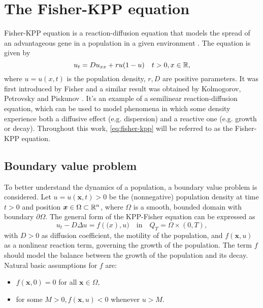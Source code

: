 \section{The Fisher-KPP equation}
Fisher-KPP equation is a reaction-diffusion equation that models the spread of an advantageous gene in a population in a given environment \cite{SalsaVerziniPDE}. The equation is given by
\begin{equation}
    u_t = Du_{xx} + ru(1-u) \quad t > 0, x \in \mathbb{R},
    \label{eq:fisher-kpp}
\end{equation}
where $u = u(x, t)$ is the population density, $r, D$ are positive parameters. It was first introduced by Fisher \cite{Fisher1937} and a similar result was obtained by Kolmogorov, Petrovsky and Piskunov \cite{KPP1937}. It's an example of a semilinear reaction-diffusion equation, which can be used to model phenomena in which some density experience both a diffusive effect (e.g. dispersion) and a reactive one (e.g. growth or decay). Throughout this work, \eqref{eq:fisher-kpp} will be referred to as the Fisher-KPP equation.

\subsection{Boundary value problem}
To better understand the dynamics of a population, a boundary value problem is considered. Let \(u = u(\bm{x}, t) > 0\) be the (nonnegative) population density at time \(t > 0\) and position \(\bm{x} \in \Omega \subset \mathbb{R}^n\), where \(\Omega\) is a smooth, bounded domain with boundary \(\partial \Omega\). 
The general form of the KPP-Fisher equation can be expressed as 
\begin{equation}
    u_t - D \Delta u = f(\bm(x), u) \quad \text{in} \quad Q_T = \Omega \times (0, T),
    \label{eq:fisher-kpp-general}
\end{equation}
with \(D > 0\) as diffusion coefficient, the motility of the population, and \(f(\bm{x}, u)\) as a nonlinear reaction term, governing the growth of the population. The term \(f\) should model the balance between the growth of the population and its decay. Natural basic assumptions for \(f\) are:
\begin{itemize}
    \item \(f(\bm{x}, 0) = 0\) for all \(\bm{x} \in \Omega\),
    \item for some \(M > 0, f(\bm{x}, u) < 0\) whenever \(u > M\).
\end{itemize}
